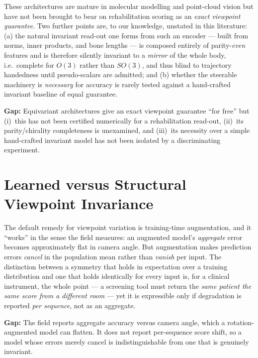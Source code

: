 \documentclass[11pt]{article}
\newcommand{\gap}[1]{\textbf{\textcolor{red!60!black}{Gap:} } #1}
\begin{document}
These architectures are mature in molecular modelling and point-cloud vision but
have not been brought to bear on rehabilitation scoring as an \emph{exact viewpoint
guarantee}. Two further points are, to our knowledge, unstated in this literature:
(a) the natural invariant read-out one forms from such an encoder --- built from
norms, inner products, and bone lengths --- is composed entirely of parity-\emph{even}
features and is therefore silently invariant to a \emph{mirror} of the whole body,
i.e.\ complete for $O(3)$ rather than $SO(3)$, and thus blind to trajectory
handedness until pseudo-scalars are admitted; and (b) whether the steerable
machinery is \emph{necessary} for accuracy is rarely tested against a hand-crafted
invariant baseline of equal guarantee.

\gap{Equivariant architectures give an exact viewpoint guarantee ``for free'' but
(i)~this has not been certified numerically for a rehabilitation read-out, (ii)~its
parity/chirality completeness is unexamined, and (iii)~its necessity over a simple
hand-crafted invariant model has not been isolated by a discriminating experiment.}

\section{Learned versus Structural Viewpoint Invariance}
\label{sec:learned}

The default remedy for viewpoint variation is training-time augmentation, and it
``works'' in the sense the field measures: an augmented model's \emph{aggregate}
error becomes approximately flat in camera angle. But augmentation makes prediction
errors \emph{cancel} in the population mean rather than \emph{vanish} per input.
The distinction between a symmetry that holds in expectation over a training
distribution and one that holds identically for every input is, for a clinical
instrument, the whole point --- a screening tool must return the \emph{same patient
the same score from a different room} --- yet it is expressible only if degradation
is reported \emph{per sequence}, not as an aggregate.

\gap{The field reports aggregate accuracy versus camera angle, which a
rotation-augmented model can flatten. It does not report per-sequence score shift,
so a model whose errors merely cancel is indistinguishable from one that is
genuinely invariant.}

\end{document}
